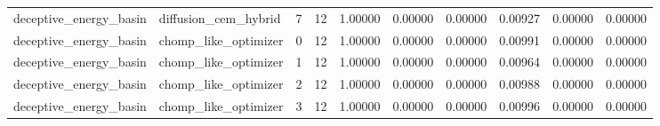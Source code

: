 \documentclass{article}
\begin{document}
\begin{table}[tbp]
{\begin{tabular}{llllllllll}
deceptive\_energy\_basin & diffusion\_cem\_hybrid & 7 & 12 & 1.00000 & 0.00000 & 0.00000 & 0.00927 & 0.00000 & 0.00000 \\
deceptive\_energy\_basin & chomp\_like\_optimizer & 0 & 12 & 1.00000 & 0.00000 & 0.00000 & 0.00991 & 0.00000 & 0.00000 \\
deceptive\_energy\_basin & chomp\_like\_optimizer & 1 & 12 & 1.00000 & 0.00000 & 0.00000 & 0.00964 & 0.00000 & 0.00000 \\
deceptive\_energy\_basin & chomp\_like\_optimizer & 2 & 12 & 1.00000 & 0.00000 & 0.00000 & 0.00988 & 0.00000 & 0.00000 \\
deceptive\_energy\_basin & chomp\_like\_optimizer & 3 & 12 & 1.00000 & 0.00000 & 0.00000 & 0.00996 & 0.00000 & 0.00000 \\
\bottomrule
\end{tabular}
}
\end{table}

\clearpage
\end{document}
